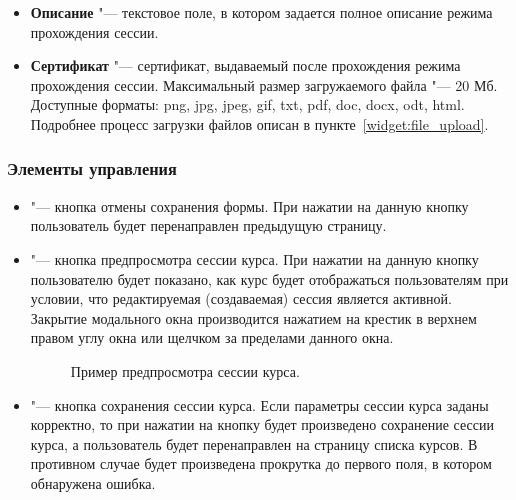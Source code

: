 \begin{itemize}
		\item \textbf{Описание} "--- текстовое поле, в котором задается полное описание режима прохождения сессии.
		
		\item \textbf{Сертификат} "--- сертификат, выдаваемый после прохождения режима прохождения сессии. Максимальный размер загружаемого файла "--- 20 Мб. Доступные форматы: png, jpg, jpeg, gif, txt, pdf, doc, docx, odt, html. Подробнее процесс загрузки файлов описан в пункте~\ref{widget:file_upload}.
	\end{itemize}
	
\subsubsection{Элементы управления}
\begin{itemize}
	\item {} "--- кнопка отмены сохранения формы. При нажатии на данную кнопку пользователь будет перенаправлен предыдущую страницу.
	\item {} "--- кнопка предпросмотра сессии курса. При нажатии на данную кнопку пользователю будет показано, как курс будет отображаться пользователям при условии, что редактируемая (создаваемая) сессия является активной. Закрытие модального окна производится нажатием на крестик в верхнем правом углу окна или щелчком за пределами данного окна.
	\begin{figure}[H]
		\caption{Пример предпросмотра сессии курса.}
		\label{img:course_session:course_session_preview}
	\end{figure}
	
	\item {} "--- кнопка сохранения сессии курса. Если параметры сессии курса заданы корректно, то при нажатии на кнопку будет произведено сохранение сессии курса, а пользователь будет перенаправлен на страницу списка курсов. В противном случае будет произведена прокрутка до первого поля, в котором обнаружена ошибка.
\end{itemize}